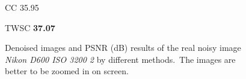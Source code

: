 \begin{figure}[t!]
{\begin{minipage}[t]{0.19\textwidth}
{\footnotesize CC 35.95}
\end{minipage}
\begin{minipage}[t]{0.19\textwidth}
\centering
{}
{\footnotesize TWSC \textbf{37.07}}
\end{minipage}
}\vspace{-3mm}
    \caption{Denoised images and PSNR (dB) results of the real noisy image \textsl{Nikon D600 ISO 3200 2} \cite{crosschannel2016} by different methods.\ The images are better to be zoomed in on screen.}
    \label{fig5-12}
\end{figure}


